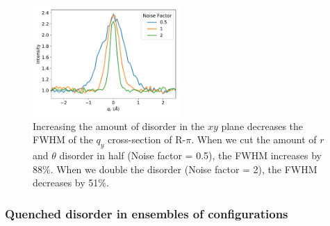 \documentclass[journal=jpcbfk,manuscript=article]{achemso}
\begin{document}
  \begin{figure}
  \centering
  \includegraphics[width=0.5\textwidth]{qy_fwhm.pdf}
  \caption{Increasing the amount of disorder in the $xy$ plane decreases the
	  FWHM of the $q_y$ cross-section of R-$\pi$. When we cut the amount of $r$ and
	  $\theta$ disorder in half (Noise factor = 0.5), the FWHM increases by 88\%. When
	  we double the disorder (Noise factor = 2), the FWHM decreases by
	  51\%.}\label{fig:qy_fwhm}
  \end{figure}
  
  
  \subsubsection*{Quenched disorder in ensembles of configurations}  

\end{document}
